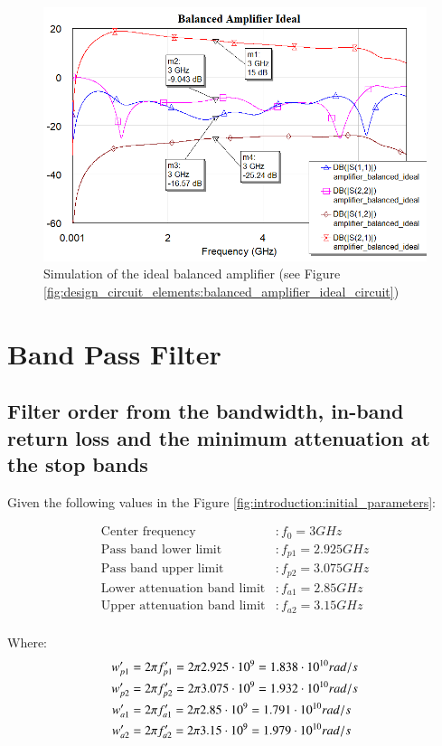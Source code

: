 \documentclass[12pt]{report} %
\let\oldsection\section
\renewcommand\section{\clearpage\oldsection}
\begin{document}
\begin{figure}
    \centering
    \includegraphics[width=1\linewidth]{images//design_circuit_elements/balanced_amplifier_ideal_graph.png}
    \caption{Simulation of the ideal balanced amplifier (see Figure \ref{fig:design_circuit_elements:balanced_amplifier_ideal_circuit})}
    \label{fig:design_circuit_elements:balanced_amplifier_ideal_graph}
\end{figure}

\section{Band Pass Filter}

\subsection{Filter order from the bandwidth, in-band return loss and the minimum attenuation at the stop bands}

Given the following values in the Figure \ref{fig:introduction:initial_parameters}:

\begin{align*}
\text{Center frequency} & : f_0 = 3 GHz\\
\text{Pass band lower limit} & : f_{p1} = 2.925 GHz\\
\text{Pass band upper limit} & : f_{p2} = 3.075 GHz\\
\text{Lower attenuation band limit} & : f_{a1} = 2.85 GHz\\
\text{Upper attenuation band limit} & : f_{a2} = 3.15 GHz\\
\end{align*}

Where:
\begin{align*}
w'_{p1} &= 2 \* \pi \* f'_{p1} = 2 \* \pi \* 2.925 \cdot 10^9 = 1.838 \cdot 10^{10} rad/s \\
w'_{p2} &= 2 \* \pi \* f'_{p2} = 2 \* \pi \* 3.075 \cdot 10^9 = 1.932 \cdot 10^{10} rad/s \\
w'_{a1} &= 2 \* \pi \* f'_{a1} = 2 \* \pi \* 2.85 \cdot 10^9 = 1.791 \cdot 10^{10} rad/s \\
w'_{a2} &= 2 \* \pi \* f'_{a2} = 2 \* \pi \* 3.15 \cdot 10^9 = 1.979 \cdot 10^{10} rad/s \\
\end{align*}
\end{document}
